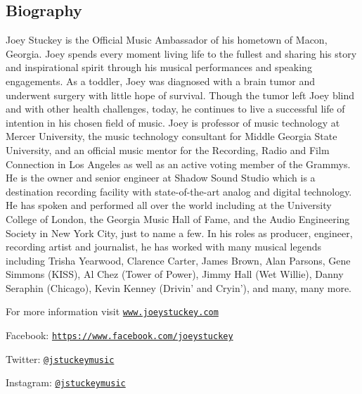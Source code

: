 \subsection*{Biography}
Joey Stuckey is the Official Music Ambassador of his hometown of Macon, Georgia. Joey spends every moment living life to the fullest and sharing his story and inspirational spirit through his musical performances and speaking engagements. As a toddler, Joey was diagnosed with a brain tumor and underwent surgery with little hope of survival. Though the tumor left Joey blind and with other health challenges, today, he continues to live a successful life of intention in his chosen field of music. Joey is professor of music technology at Mercer University, the music technology consultant for Middle Georgia State University, and an official music mentor for the Recording, Radio and Film Connection in Los Angeles as well as an active voting member of the Grammys. He is the owner and senior engineer at Shadow Sound Studio which is a destination recording facility with state-of-the-art analog and digital technology. He has spoken and performed all over the world including at the University College of London, the Georgia Music Hall of Fame, and the Audio Engineering Society in New York City, just to name a few. In his roles as producer, engineer, recording artist and journalist, he has worked with many musical legends including Trisha Yearwood, Clarence Carter, James Brown, Alan Parsons, Gene Simmons (KISS), Al Chez (Tower of Power), Jimmy Hall (Wet Willie), Danny Seraphin (Chicago), Kevin Kenney (Drivin' and Cryin'), and many, many more.

For more information visit \href{https://www.joeystuckey.com}{\nolinkurl{www.joeystuckey.com}}

Facebook: \href{https://www.facebook.com/joeystuckey/}{\nolinkurl{https://www.facebook.com/joeystuckey}}

Twitter: \href{https://twitter.com/jstuckeymusic/}{\nolinkurl{@jstuckeymusic}}

Instagram: \href{https://www.instagram.com/jstuckeymusic/}{\nolinkurl{@jstuckeymusic}}
